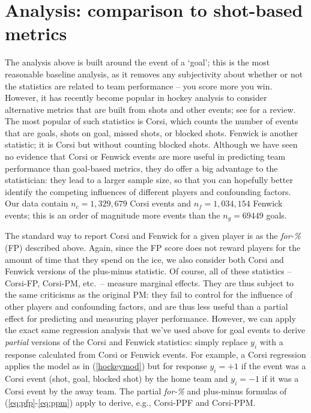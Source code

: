 \section{Analysis: comparison to shot-based metrics}
\label{sec:shots}


The analysis above is built around the event of a `goal'; this is the most
reasonable baseline analysis, as it removes any subjectivity about whether or
not the statistics are related to team performance -- you score more you win.
However, it has recently become popular in hockey analysis to consider
alternative metrics that are built from shots and other events; see
\cite{vol10} for a review. The most popular of such statistics is Corsi, which
counts the number of events that are goals, shots on goal, missed shots, or
blocked shots.  Fenwick is another statistic; it is Corsi but without counting
blocked shots.  Although we have seen no evidence that Corsi or Fenwick events
are more useful in predicting team performance than goal-based metrics, they
do offer a big advantage to the statistician: they lead to a larger sample
size, so that you can hopefully better identify the competing influences of
different players and confounding factors. Our data contain
$n_{c}=1,329,679$ Corsi events and $n_{f}=1,034,154$ Fenwick events; this is
an order of magnitude more events than the $n_g=69449$ goals.

The standard way to report Corsi and Fenwick for a given player is as the
\textit{for-\%} (FP) described above.  Again, since the FP score does not
reward players for the amount of time that they spend on the ice, we also
consider both Corsi and Fenwick versions of the plus-minus statistic. Of
course, all of these statistics -- Corsi-FP, Corsi-PM, etc.~-- measure
marginal effects.  They are thus subject to the same criticisms as the
original PM: they fail to control for the influence of other players and
confounding factors, and are thus less useful than a partial effect for
predicting and measuring player performance.  However, we can apply the exact
same regression analysis that we've used above for goal events to derive
\textit{partial} versions of the Corsi and Fenwick statistics: simply replace
$y_i$ with a response calculated from Corsi or Fenwick events.  For example, a
Corsi regression applies the model as in (\ref{hockeymod}) but for response
$y_i=+1$ if the event was a Corsi event (shot, goal, blocked shot) by the home
team and $y_i=-1$ if it was a Corsi event by the away team. The partial \textit{for-\%}
and plus-minus formulas of (\ref{eq:pfp}-\ref{eq:ppm}) apply to derive, e.g.,
Corsi-PPF and Corsi-PPM.

